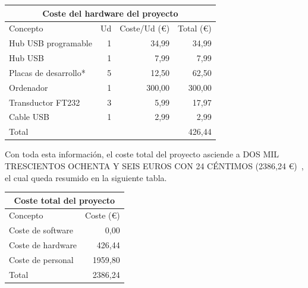 \documentclass[spanish]{template/minim}
\begin{document}
\begin{table}[H]
    \centering
    \begin{tabularx}{\textwidth}{Xrrr}
      \toprule
      \multicolumn{4}{c}{Coste del hardware del proyecto} \\
      \midrule
      Concepto & Ud & Coste/Ud (\euro{}) & Total (\euro{}) \\
      \midrule
      Hub USB programable & 1 & 34,99 & 34,99 \\
      Hub USB & 1 & 7,99 & 7,99 \\
      Placas de desarrollo* & 5 & 12,50 & 62,50 \\
      Ordenador & 1 & 300,00 & 300,00 \\
      Transductor FT232 & 3 & 5,99 & 17,97 \\
      Cable USB & 1 & 2,99 & 2,99 \\
      \midrule
      Total & & & 426,44 \\
      \bottomrule
    \end{tabularx}
\end{table}


Con toda esta información, el coste total del proyecto asciende a DOS MIL TRESCIENTOS OCHENTA Y SEIS EUROS CON 24 CÉNTIMOS (2386,24 \euro{})~, el cual queda resumido en la siguiente tabla.\\

\begin{table}[H]
    \centering
    \begin{tabularx}{\textwidth}{Xr}
      \toprule
      \multicolumn{2}{c}{Coste total del proyecto} \\
      \midrule
      Concepto & Coste (\euro{}) \\
      \midrule
      Coste de software & 0,00 \\
      Coste de hardware & 426,44 \\
      Coste de personal & 1959,80 \\
      \midrule
      Total & 2386,24 \\
      \bottomrule
    \end{tabularx}
\end{table}
\end{document}
